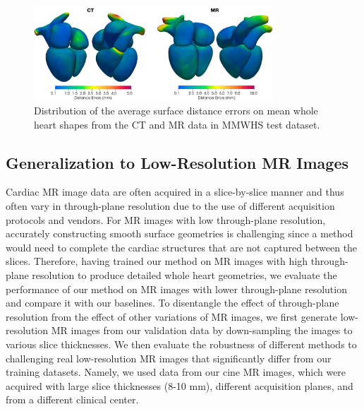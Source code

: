 \documentclass[times,review,preprint,authoryear]{elsarticle}
\begin{document}
\begin{figure}[H]
\centering
\includegraphics[width=0.8\textwidth]{distance_error.png}
\caption{Distribution of the average surface distance errors on mean whole heart shapes from the CT and MR data in MMWHS test dataset.} 
\label{figure:distance_error}
\end{figure}


\subsection{Generalization to Low-Resolution MR Images}
Cardiac MR image data are often acquired in a slice-by-slice manner and thus often vary in through-plane resolution due to the use of different acquisition protocols and vendors. For MR images with low through-plane resolution, accurately constructing smooth surface geometries is challenging since a method would need to complete the cardiac structures that are not captured between the slices. Therefore, having trained our method on MR images with high through-plane resolution to produce detailed whole heart geometries, we evaluate the performance of our method on MR images with lower through-plane resolution and compare it with our baselines. To disentangle the effect of through-plane resolution from the effect of other variations of MR images, we first generate low-resolution MR images from our validation data by down-sampling the images to various slice thicknesses. We then evaluate the robustness of different methods to challenging real low-resolution MR images that significantly differ from our training datasets. Namely, we used data from our cine MR images, which were acquired with large slice thicknesses (8-10 mm), different acquisition planes, and from a different clinical center.  
\end{document}
